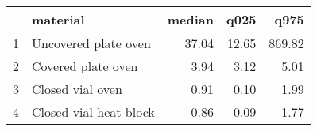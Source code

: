 \begin{table}[ht]
\centering
\begin{tabular}{rlrrr}
  \hline
 & material & median & q025 & q975 \\ 
  \hline
1 & Uncovered
plate oven & 37.04 & 12.65 & 869.82 \\ 
  2 & Covered
plate oven & 3.94 & 3.12 & 5.01 \\ 
  3 & Closed vial
oven & 0.91 & 0.10 & 1.99 \\ 
  4 & Closed vial
heat block & 0.86 & 0.09 & 1.77 \\ 
   \hline
\end{tabular}
\end{table}

